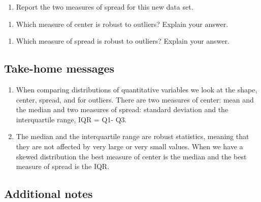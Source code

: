 \documentclass[
]{report}
\providecommand{\tightlist}{%
  \setlength{\itemsep}{0pt}\setlength{\parskip}{0pt}}
\begin{document}
\vspace{0.8in}

\begin{enumerate}
\def\labelenumi{\arabic{enumi}.}
\setcounter{enumi}{10}
\tightlist
\item
  Report the two measures of spread for this new data set.
\end{enumerate}

\vspace{0.8in}

\begin{enumerate}
\def\labelenumi{\arabic{enumi}.}
\setcounter{enumi}{11}
\tightlist
\item
  Which measure of center is robust to outliers? Explain your answer.
\end{enumerate}

\vspace{0.5in}

\begin{enumerate}
\def\labelenumi{\arabic{enumi}.}
\setcounter{enumi}{12}
\tightlist
\item
  Which measure of spread is robust to outliers? Explain your answer.
\end{enumerate}

\vspace{0.5in}

\hypertarget{take-home-messages-6}{%
\subsection{Take-home messages}\label{take-home-messages-6}}

\begin{enumerate}
\def\labelenumi{\arabic{enumi}.}
\item
  When comparing distributions of quantitative variables we look at the shape, center, spread, and for outliers. There are two measures of center: mean and the median and two measures of spread: standard deviation and the interquartile range, IQR = Q1- Q3.
\item
  The median and the interquartile range are robust statistics, meaning that they are not affected by very large or very small values. When we have a skewed distribution the best measure of center is the median and the best measure of spread is the IQR.
\end{enumerate}

\hypertarget{additional-notes-6}{%
\subsection{Additional notes}\label{additional-notes-6}}
\end{document}
